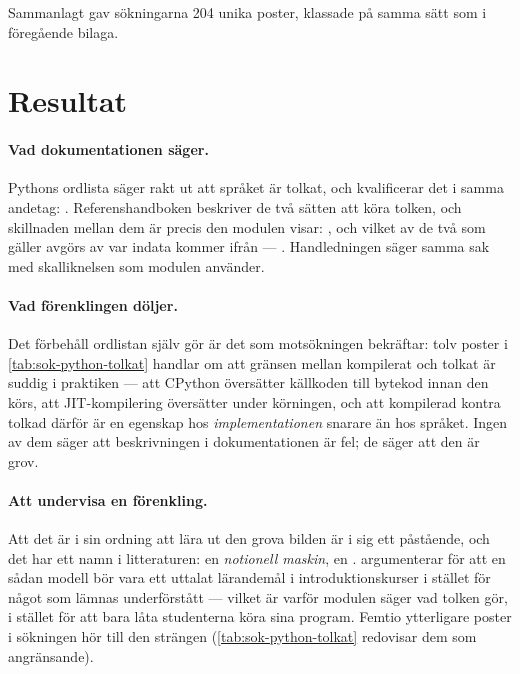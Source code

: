 Sammanlagt gav sökningarna 204 unika poster, klassade på samma sätt som i
föregående bilaga.

\section{Resultat}
\label{sec:py-resultat}

\paragraph{Vad dokumentationen säger.}  Pythons ordlista säger rakt ut att
språket är tolkat, och kvalificerar det i samma andetag:
.  Referenshandboken beskriver de två sätten att köra tolken, och
skillnaden mellan dem är precis den modulen visar:
, och vilket av de två som gäller avgörs av var indata kommer ifrån
--- .  Handledningen säger samma sak med
skalliknelsen som modulen använder\autocite{PythonTutorialInterpreter}.

\paragraph{Vad förenklingen döljer.}  Det förbehåll ordlistan själv gör
är det som motsökningen bekräftar: tolv poster i
\cref{tab:sok-python-tolkat} handlar om att gränsen mellan kompilerat och
tolkat är suddig i praktiken --- att CPython översätter källkoden till
bytekod innan den körs, att JIT-kompilering översätter under körningen,
och att kompilerad kontra tolkad därför är en egenskap hos
\emph{implementationen} snarare än hos språket.  Ingen av dem säger att
beskrivningen i dokumentationen är fel; de säger att den är grov.

\paragraph{Att undervisa en förenkling.}  Att det är i sin ordning att
lära ut den grova bilden är i sig ett påstående, och det har ett namn i
litteraturen: en \emph{notionell maskin}, en
.  \Textcite{Sorva2013NotionalMachines}
argumenterar för att en sådan modell bör vara ett uttalat lärandemål i
introduktionskurser i stället för något som lämnas underförstått ---
vilket är varför modulen säger vad tolken gör, i stället för att bara
låta studenterna köra sina program.  Femtio ytterligare poster i
sökningen hör till den strängen (\cref{tab:sok-python-tolkat} redovisar
dem som angränsande).

